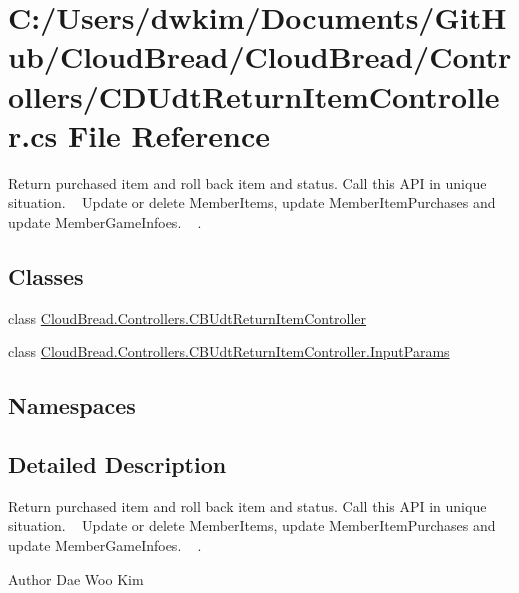 \hypertarget{a00234}{}\section{C\+:/\+Users/dwkim/\+Documents/\+Git\+Hub/\+Cloud\+Bread/\+Cloud\+Bread/\+Controllers/\+C\+D\+Udt\+Return\+Item\+Controller.cs File Reference}
\label{a00234}


Return purchased item and roll back item and status. Call this A\+PI in unique situation. ~\newline
Update or delete Member\+Items, update Member\+Item\+Purchases and update Member\+Game\+Infoes. ~\newline
.  


\subsection*{Classes}
\begin{DoxyCompactItemize}
\item 
class \hyperlink{a00061}{Cloud\+Bread.\+Controllers.\+C\+B\+Udt\+Return\+Item\+Controller}
\item 
class \hyperlink{a00118}{Cloud\+Bread.\+Controllers.\+C\+B\+Udt\+Return\+Item\+Controller.\+Input\+Params}
\end{DoxyCompactItemize}
\subsection*{Namespaces}
\begin{DoxyCompactItemize}
\end{DoxyCompactItemize}


\subsection{Detailed Description}
Return purchased item and roll back item and status. Call this A\+PI in unique situation. ~\newline
Update or delete Member\+Items, update Member\+Item\+Purchases and update Member\+Game\+Infoes. ~\newline
. 

\begin{DoxyAuthor}{Author}
Dae Woo Kim 
\end{DoxyAuthor}

